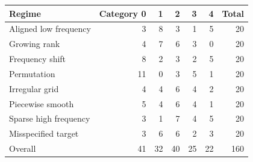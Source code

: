 \begin{tabular}{lrrrrrr}
\toprule
Regime & Category 0 & 1 & 2 & 3 & 4 & Total \\
\midrule
Aligned low frequency & 3 & 8 & 3 & 1 & 5 & 20 \\
Growing rank & 4 & 7 & 6 & 3 & 0 & 20 \\
Frequency shift & 8 & 2 & 3 & 2 & 5 & 20 \\
Permutation & 11 & 0 & 3 & 5 & 1 & 20 \\
Irregular grid & 4 & 4 & 6 & 4 & 2 & 20 \\
Piecewise smooth & 5 & 4 & 6 & 4 & 1 & 20 \\
Sparse high frequency & 3 & 1 & 7 & 4 & 5 & 20 \\
Misspecified target & 3 & 6 & 6 & 2 & 3 & 20 \\
\midrule
Overall & 41 & 32 & 40 & 25 & 22 & 160 \\
\bottomrule
\end{tabular}
